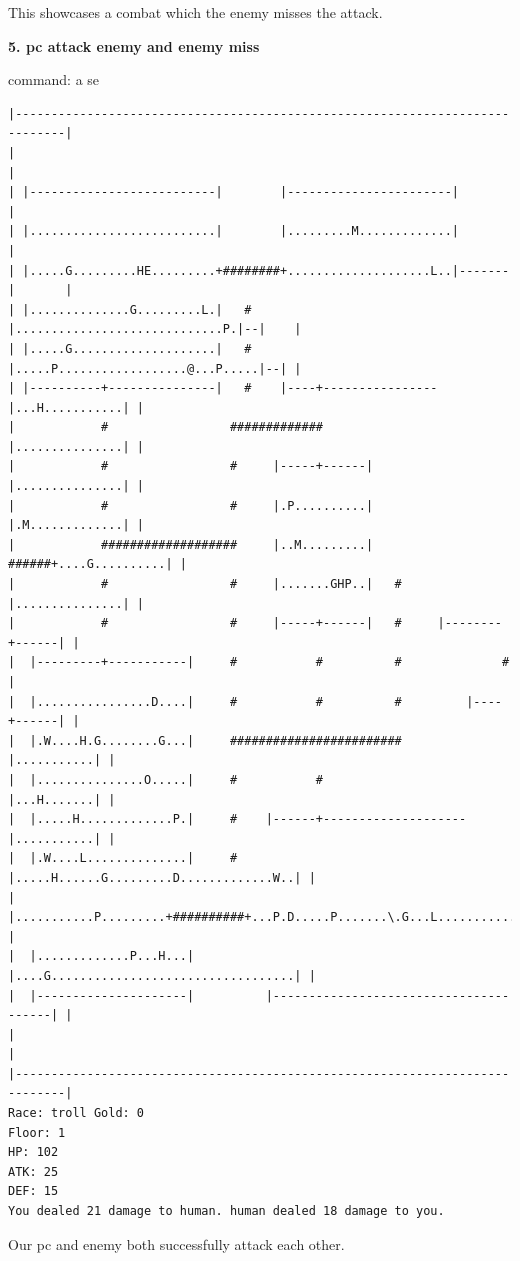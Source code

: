\documentclass[11pt]{article}
\theoremstyle{plain}
\begin{document}
This showcases a combat which the enemy misses the attack.

\newpage
\textbf{5. pc attack enemy and enemy miss}

command: a se
\begin{Verbatim}[fontsize=\scriptsize]
|-----------------------------------------------------------------------------|
|                                                                             |
| |--------------------------|        |-----------------------|               |
| |..........................|        |.........M.............|               |
| |.....G.........HE.........+########+....................L..|-------|       |
| |..............G.........L.|   #    |.............................P.|--|    |
| |.....G....................|   #    |.....P..................@...P.....|--| |
| |----------+---------------|   #    |----+----------------|...H...........| |
|            #                 #############                |...............| |
|            #                 #     |-----+------|         |...............| |
|            #                 #     |.P..........|         |.M.............| |
|            ###################     |..M.........|   ######+....G..........| |
|            #                 #     |.......GHP..|   #     |...............| |
|            #                 #     |-----+------|   #     |--------+------| |
|  |---------+-----------|     #           #          #              #        |
|  |................D....|     #           #          #         |----+------| |
|  |.W....H.G........G...|     ########################         |...........| |
|  |...............O.....|     #           #                    |...H.......| |
|  |.....H.............P.|     #    |------+--------------------|...........| |
|  |.W....L..............|     #    |.....H......G.........D.............W..| |
|  |...........P.........+##########+...P.D.....P.......\.G...L.............| |
|  |.............P...H...|          |....G..................................| |
|  |---------------------|          |---------------------------------------| |
|                                                                             |
|-----------------------------------------------------------------------------|
Race: troll Gold: 0                                                    Floor: 1
HP: 102
ATK: 25
DEF: 15
You dealed 21 damage to human. human dealed 18 damage to you. 
\end{Verbatim}

Our pc and enemy both successfully attack each other.
\end{document}
